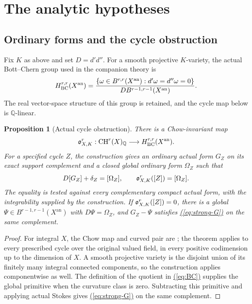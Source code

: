 \documentclass[11pt,a4paper]{article}
\newtheorem{proposition}[theorem]{Proposition}
\theoremstyle{definition}
\theoremstyle{remark}\newtheorem{remark}[theorem]{Remark}
\numberwithin{equation}{section}
\newcommand{\Q}{\mathbb Q}\newcommand{\R}{\mathbb R}\newcommand{\C}{\mathbb C}
\newcommand{\CH}{\operatorname{CH}}\newcommand{\an}{\mathrm{an}}
\renewcommand{\eqref}[1]{\hyperref[#1]{\textcolor{equationlink}{(\ref*{#1})}}}
\begin{document}
\section{The analytic hypotheses}\label{sec:analytic}

\subsection{Ordinary forms and the cycle obstruction}\label{sub:obstruction}

Fix $K$ as above and set $D=d'd''$. For a smooth projective $K$-variety,
the actual Bott--Chern group used in the companion theory is
\begin{equation}\label{eq:BC}
 H_{\BC}^{r,r}(X^{\an})=
 \frac{\{\omega\in B^{r,r}(X^{\an}):d'\omega=d''\omega=0\}}
 {D B^{r-1,r-1}(X^{\an})}.
\end{equation}
The real vector-space structure of this group is retained, and the
cycle map below is $\Q$-linear.

\begin{proposition}[Actual cycle obstruction]\label{prop:obstruction}
There is a Chow-invariant map
\[
 \ob^r_{X,K}:\CH^r(X)_\Q\longrightarrow H_{\BC}^{r,r}(X^{\an}).
\]
For a specified cycle $Z$, the construction gives an ordinary actual
form $G_Z$ on its exact support complement and a closed global ordinary
form $\Omega_Z$ such that
\begin{equation}\label{eq:curved}
       D[G_Z]+\delta_Z=[\Omega_Z],
       \qquad \mathfrak o^r_{X,K}([Z])=[\Omega_Z].
\end{equation}
The equality is tested against every complementary compact actual form,
with the integrability supplied by the construction. If
$\mathfrak o^r_{X,K}([Z])=0$, there is a global
$\Psi\in B^{r-1,r-1}(X^{\an})$ with $D\Psi=\Omega_Z$, and
$G_Z-\Psi$ satisfies \eqref{eq:strong-G} on the same complement.
\end{proposition}

\begin{proof}
For integral $X$, the Chow map and curved pair are
\cite[Theorem 1.1]{ChowGreenPairs}; the theorem applies to every
prescribed cycle over the original valued field, in every positive
codimension up to the dimension of $X$. A smooth projective variety
is the disjoint union of its finitely many integral connected
components, so the construction applies componentwise as well.
The definition of the quotient in \eqref{eq:BC} supplies the global
primitive when the curvature class is zero. Subtracting this
primitive and applying actual Stokes gives \eqref{eq:strong-G} on
the same complement.
\end{proof}
\end{document}
